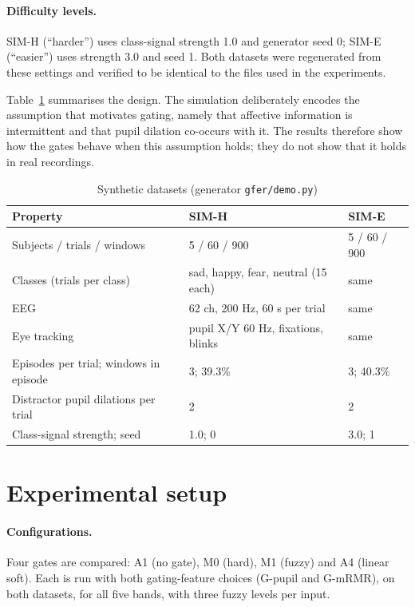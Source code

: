 \documentclass[11pt,a4paper]{article}
\begin{document}
\paragraph{Difficulty levels.} SIM-H (``harder'') uses class-signal strength 1.0 and generator seed 0; SIM-E (``easier'') uses strength 3.0 and seed 1. Both datasets were regenerated from these settings and verified to be identical to the files used in the experiments.

Table~\ref{tab:simdata} summarises the design. The simulation deliberately encodes the assumption that motivates gating, namely that affective information is intermittent and that pupil dilation co-occurs with it. The results therefore show how the gates behave when this assumption holds; they do not show that it holds in real recordings.

\begin{table}[t]
\centering\small
\caption{Synthetic datasets (generator \texttt{gfer/demo.py})}\label{tab:simdata}
\begin{tabular}{@{}lll@{}}
\toprule
Property & SIM-H & SIM-E\\
\midrule
Subjects / trials / windows & 5 / 60 / 900 & 5 / 60 / 900\\
Classes (trials per class) & sad, happy, fear, neutral (15 each) & same\\
EEG & 62 ch, 200 Hz, 60 s per trial & same\\
Eye tracking & pupil X/Y 60 Hz, fixations, blinks & same\\
Episodes per trial; windows in episode & 3; 39.3\% & 3; 40.3\%\\
Distractor pupil dilations per trial & 2 & 2\\
Class-signal strength; seed & 1.0; 0 & 3.0; 1\\
\bottomrule
\end{tabular}
\end{table}

\section{Experimental setup}
\label{sec:setup}

\paragraph{Configurations.} Four gates are compared: A1 (no gate), M0 (hard), M1 (fuzzy) and A4 (linear soft). Each is run with both gating-feature choices (G-pupil and G-mRMR), on both datasets, for all five bands, with three fuzzy levels per input.
\end{document}
